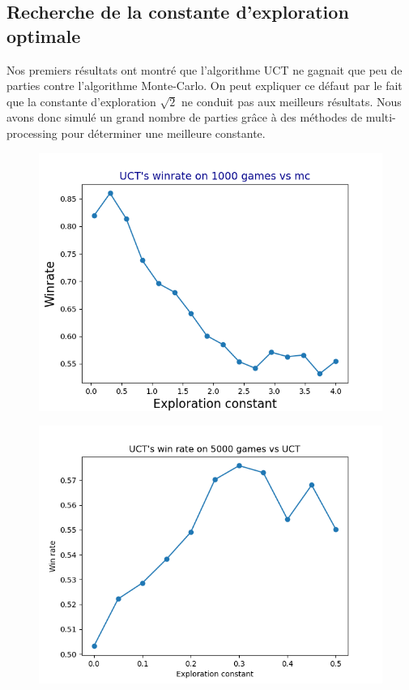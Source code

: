 \documentclass[a4paper]{article}
\theoremstyle{definition}
\begin{document}
\subsection{Recherche de la constante d'exploration optimale}

Nos premiers résultats ont montré que l'algorithme UCT ne gagnait que peu de parties contre l'algorithme Monte-Carlo. On peut expliquer ce défaut par le fait que la constante d'exploration $\sqrt{2}$ ne conduit pas aux meilleurs résultats. Nous avons donc simulé un grand nombre de parties grâce à des méthodes de multi-processing pour déterminer une meilleure constante.

\begin{figure}[h]
\centering
\includegraphics[scale=0.7]{test1.png}
\caption{}
\end{figure}

\begin{figure}[h]
\centering
\includegraphics[scale=0.7]{test2.png}
\caption{}
\end{figure}
\end{document}
